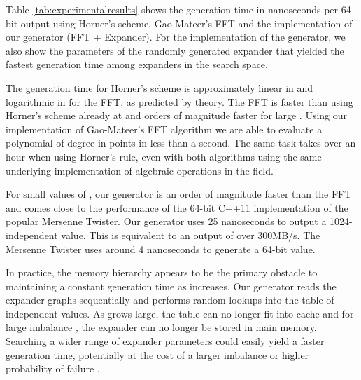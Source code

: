 \documentclass[a4paper,11pt]{article}
\theoremstyle{plain}
\theoremstyle{definition}
\begin{document}
Table \ref{tab:experimentalresults} shows the generation time in nanoseconds per 64-bit output using Horner's scheme, Gao-Mateer's FFT and the implementation of our generator (FFT + Expander).
For the implementation of the generator, we also show the parameters of the randomly generated expander that yielded the fastest generation time among expanders in the search space.

The generation time for Horner's scheme is approximately linear in  and logarithmic in  for the FFT, as predicted by theory. 
The FFT is faster than using Horner's scheme already at  and orders of magnitude faster for large .
Using our implementation of Gao-Mateer's FFT algorithm we are able to evaluate a polynomial of degree  in  points in less than a second. 
The same task takes over an hour when using Horner's rule, even with both algorithms using the same underlying implementation of algebraic operations in the field.

For small values of , our generator is an order of magnitude faster than the FFT and comes close to the performance of the 64-bit C++11 implementation of the popular Mersenne Twister.
Our generator uses 25 nanoseconds to output a 1024-independent value. This is equivalent to an output of over 300MB/s.
The Mersenne Twister uses around 4 nanoseconds to generate a 64-bit value.

In practice, the memory hierarchy appears to be the primary obstacle to maintaining a constant generation time as  increases.
Our generator reads the expander graphs sequentially and performs random lookups into the table of -independent values.
As  grows large, the table can no longer fit into cache and for large imbalance , the expander can no longer be stored in main memory.
Searching a wider range of expander parameters could easily yield a faster generation time, potentially at the cost of a larger imbalance  or higher probability of failure .
\end{document}
